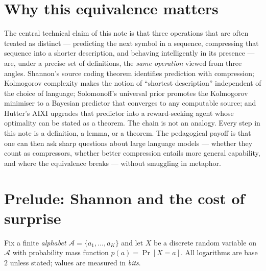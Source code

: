 
\section{Why this equivalence matters}
\label{sec:why}

The central technical claim of this note is that three operations that are
often treated as distinct --- predicting the next symbol in a sequence,
compressing that sequence into a shorter description, and behaving
intelligently in its presence --- are, under a precise set of definitions,
the \emph{same operation} viewed from three angles. Shannon's source coding
theorem \citep{shannon1948mathematical} identifies prediction with
compression; Kolmogorov complexity \citep{kolmogorov1965three} makes the
notion of ``shortest description'' independent of the choice of language;
Solomonoff's universal prior \citep{solomonoff1964formal} promotes the
Kolmogorov minimiser to a Bayesian predictor that converges to any
computable source; and Hutter's AIXI \citep{hutter2005universal}
upgrades that predictor into a reward-seeking agent whose optimality can
be stated as a theorem. The chain is not an analogy. Every step in this
note is a definition, a lemma, or a theorem. The pedagogical payoff is
that one can then ask sharp questions about large language models ---
whether they count as compressors, whether better compression entails
more general capability, and where the equivalence breaks --- without
smuggling in metaphor.

\section{Prelude: Shannon and the cost of surprise}
\label{sec:shannon-prelude}

Fix a finite \emph{alphabet} $\mathcal{A} = \{a_1, \dots, a_K\}$ and let
$X$ be a discrete random variable on $\mathcal{A}$ with probability mass
function $p(a) = \Pr[X = a]$. All logarithms are base $2$ unless stated;
values are measured in \emph{bits}.


